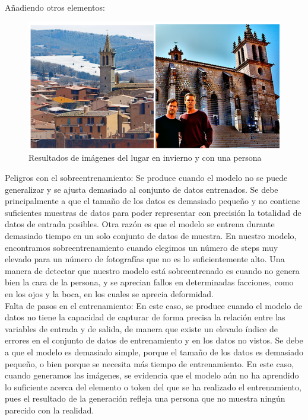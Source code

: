 Añadiendo otros elementos:\\


\begin{figure}[!htb]
	\centering
	\includegraphics[width = 0.6
	\textwidth]{Imagenes/Vectorial/colmenar_elements.png}
	\caption{Resultados de imágenes del lugar en invierno y con una persona}
	\label{fig:sampleImage}
\end{figure}


Peligros con el sobreentrenamiento: Se produce cuando el modelo no se puede generalizar y se ajusta demasiado al conjunto de datos entrenados. Se debe principalmente a que el tamaño de los datos es demasiado pequeño y no contiene suficientes muestras de datos para poder representar con precisión la totalidad de datos de entrada posibles. Otra razón es que el modelo se entrena durante demasiado tiempo en un solo conjunto de datos de muestra. En nuestro modelo, encontramos sobreentrenamiento cuando elegimos un número de steps muy elevado para un número de fotografías que no es lo suficientemente alto. Una manera de detectar que nuestro modelo está sobreentrenado es cuando no genera bien la cara de la persona, y se aprecian fallos en determinadas facciones, como en los ojos y la boca, en los cuales se aprecia deformidad.\\

Falta de pasos en el entrenamiento: En este caso, se produce cuando el modelo de datos no tiene la capacidad de capturar de forma precisa la relación entre las variables de entrada y de salida, de manera que existe un elevado índice de errores en el conjunto de datos de entrenamiento y en los datos no vistos. Se debe a que el modelo es demasiado simple, porque el tamaño de los datos es demasiado pequeño, o bien porque se necesita más tiempo de entrenamiento. En este caso, cuando generamos las imágenes, se evidencia que el modelo aún no ha aprendido lo suficiente acerca del elemento o token del que se ha realizado el entrenamiento, pues el resultado de la generación refleja una persona que no muestra ningún parecido con la realidad.\\

